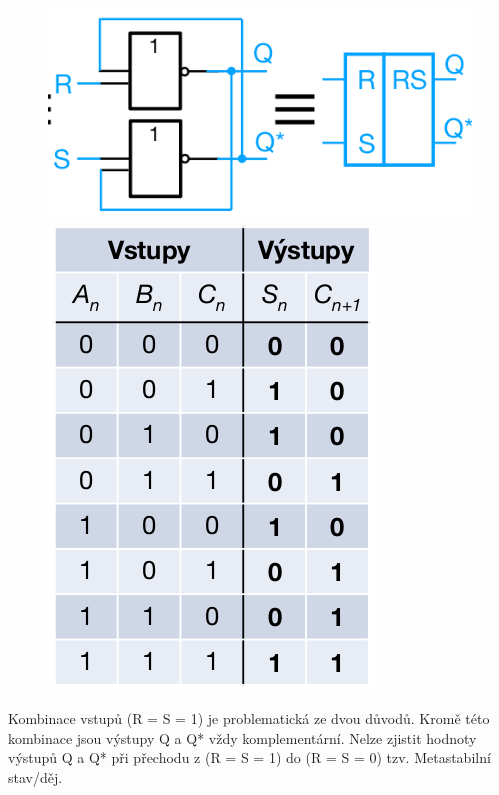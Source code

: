 \begin{figure}[h!]
    \centering
    \begin{minipage}[b]{0.4\textwidth}
        \includegraphics[scale = 0.4]{img/RSor.png}
    \end{minipage}
    \hfill
    \begin{minipage}[b]{0.4\textwidth}
        \includegraphics[scale = 0.3]{img/FATab.png}
    \end{minipage}
\end{figure}

Kombinace vstupů (R = S = 1) je problematická ze dvou důvodů. Kromě této kombinace jsou výstupy Q a Q* vždy komplementární. Nelze zjistit hodnoty výstupů Q a Q* při přechodu z (R = S = 1) do (R = S = 0) tzv. Metastabilní stav/děj.\\

